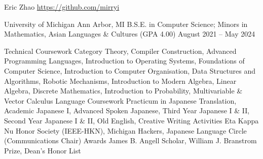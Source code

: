 \documentclass[letterpaper,11pt]{article}
\begin{document}
\rheading
  {Eric Zhao}
  {}
  {\href{https://github.com/mirryi}{https://github.com/mirryi}}
  {}

  \begin{rsectionlist}
    \rsectionitem
      {University of Michigan}
      {Ann Arbor, MI}
      {B.S.E. in Computer Science; Minors in Mathematics, Asian Languages \& Cultures (GPA 4.00)}
      {August 2021 -- May 2024}
      \begin{rpointlist}
        \rpoint
          {Technical Coursework}
          {Category Theory, Compiler Construction, Advanced Programming Languages,
            Introduction to Operating Systems, Foundations of Computer Science,
            Introduction to Computer Organisation, Data Structures and Algorithms,
            Robotic Mechanisms,
            Introduction to Modern Algebra, Linear Algebra, Discrete Mathematics,
            Introduction to Probability, Multivariable \& Vector Calculus}
        \rpoint
          {Language Coursework}
          {Practicum in Japanese Translation, Academic Japanese I, Advanced Spoken Japanese,
            Third Year Japanese I \& II, Second Year Japanese I \& II,
            Old English, Creative Writing}
        \rpoint
          {Activities}
          {Eta Kappa Nu Honor Society (IEEE-HKN), Michigan Hackers,
            Japanese Language Circle (Communications Chair)}
        \rpoint
          {Awards}
          {James B. Angell Scholar, William J. Branstrom Prize, Dean's Honor List}
      \end{rpointlist}

  \end{rsectionlist}
\end{document}
